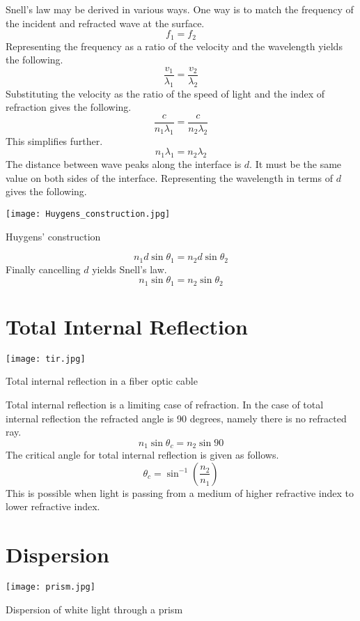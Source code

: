 Snell's law may be derived in various ways.  One way is to match the frequency of the incident and refracted wave at the surface.
$$f_1=f_2$$
Representing the frequency as a ratio of the velocity and the wavelength yields the following.
$$ \frac{v_1}{\lambda_1}= \frac{v_2}{\lambda_2}$$
Substituting the velocity as the ratio of the speed of light and the index of refraction gives the following.
$$ \frac{c}{n_1\lambda_1}= \frac{c}{n_2\lambda_2}$$
This simplifies further.
$$n_1 \lambda_1 =n_2 \lambda_2 $$
The distance between wave peaks along the interface is $d$.  It must be the same value on both sides of the interface.  Representing the wavelength in terms of $d$ gives the following.
\begin{marginfigure}%
  \texttt{[image: Huygens\_construction.jpg]}
  \caption{Huygens' construction}
  \label{fig:marginfig}
\end{marginfigure}
$$n_1 d \sin \theta_1=n_2 d \sin \theta_2$$
Finally cancelling $d$ yields Snell's law. 
$$n_1  \sin \theta_1=n_2  \sin \theta_2$$

\section{Total Internal Reflection}
\begin{marginfigure}[40pt]
  \texttt{[image: tir.jpg]}
  \caption{Total internal reflection in a fiber optic cable}
  \label{fig:marginfig}
\end{marginfigure}
Total internal reflection is a limiting case of refraction.  In the case of total internal reflection the refracted angle is 90 degrees, namely there is no refracted ray.
$$n_1\sin\theta_c=n_2\sin 90$$
The critical angle for total internal reflection is given as follows.
$$\theta_c=\sin^{-1}\left(\frac{n_2}{n_1}\right)$$
This is possible when light is passing from a medium of higher refractive index to lower refractive index.

\newpage

\section{Dispersion}
\begin{marginfigure}[0pt]
  \texttt{[image: prism.jpg]}
  \caption{Dispersion of white light through a prism}
  \label{fig:marginfig}
\end{marginfigure}

